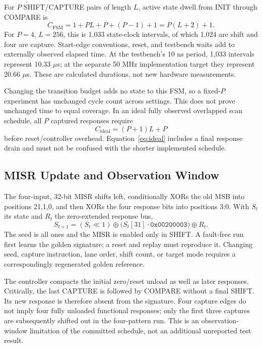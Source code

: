\documentclass[conference,a4paper]{IEEEtran}
\begin{document}
For $P$ SHIFT/CAPTURE pairs of length $L$, active state dwell from INIT through
COMPARE is
\begin{equation}
 C_{\mathrm{FSM}}=1+PL+P+(P-1)+1=P(L+2)+1.
\label{eq:fsm}
\end{equation}
For $P=4$, $L=256$, this is 1,033 state-clock intervals, of which 1,024 are
shift and four are capture. Start-edge conventions, reset, and testbench waits
add to externally observed elapsed time. At the testbench's 10 ns period,
1,033 intervals represent 10.33 $\mu$s; at the separate 50 MHz implementation
target they represent 20.66 $\mu$s. These are calculated durations, not new
hardware measurements.

Changing the transition budget adds no state to this FSM, so a fixed-$P$
experiment has unchanged cycle count across settings. This does not prove
unchanged time to equal coverage. In an ideal fully observed overlapped scan
schedule, all $P$ captured responses require
\begin{equation}
 C_{\mathrm{ideal}}=(P+1)L+P
\label{eq:ideal}
\end{equation}
before reset/controller overhead. Equation~\eqref{eq:ideal} includes a final
response drain and must not be confused with the shorter implemented schedule.

\subsection{MISR Update and Observation Window}
The four-input, 32-bit MISR shifts left, conditionally XORs the old MSB into
positions 21,1,0, and then XORs the four response bits into positions 3:0.
With $S_t$ its state and $R_t$ the zero-extended response bus,
\begin{equation}
 S_{t+1}=(S_t\ll1)\oplus
 \big(S_t[31]\cdot\mathtt{0x00200003}\big)\oplus R_t.
\end{equation}
The seed is all ones and the MISR is enabled only in SHIFT. A fault-free run
first learns the golden signature; a reset and replay must reproduce it.
Changing seed, capture instruction, lane order, shift count, or target mode
requires a correspondingly regenerated golden reference.

The controller compacts the initial zero/reset unload as well as later
responses. Critically, the last CAPTURE is followed by COMPARE without a final
SHIFT. Its new response is therefore absent from the signature. Four capture
edges do not imply four fully unloaded functional responses; only the first
three captures are subsequently shifted out in the four-pattern run. This is
an observation-window limitation of the committed schedule, not an additional
unreported test result.
\end{document}
